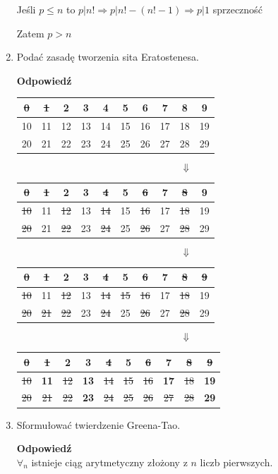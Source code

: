 \documentclass[12pt,a4paper]{article}
\newcounter{twierdzenie}
\theoremstyle{break}
\newcommand{\Odp}[1]{
		\begin{mdframed}[style=zadanie]
			\textbf{Odpowiedź}\\
			#1
		\end{mdframed}
	}
\begin{document}
\begin{enumerate}[1.]
{\begin{enumerate}[$1^\circ$]
			Jeśli $p\leq n$ to $p|n! \Rightarrow p|n!-(n!-1) \Rightarrow p|1$ sprzeczność
			
			Zatem $p>n$
		\end{enumerate}
	}
	
	\item Podać zasadę tworzenia sita Eratostenesa.
	\Odp{
		\centering\begin{tabular}{|c|c|c|c|c|c|c|c|c|c|}\hline
			\sout{0}&\sout{1}&2&3&4&5&6&7&8&9\\\hline
			10&11&12&13&14&15&16&17&18&19\\\hline
			20&21&22&23&24&25&26&27&28&29\\\hline
		\end{tabular}
		$$\Downarrow$$
		\centering\begin{tabular}{|c|c|c|c|c|c|c|c|c|c|}\hline
			\sout{0}&\sout{1}&\textbf{2}&3&\sout{4}&5&\sout{6}&7&\sout{8}&9\\\hline
			\sout{10}&11&\sout{12}&13&\sout{14}&15&\sout{16}&17&\sout{18}&19\\\hline
			\sout{20}&21&\sout{22}&23&\sout{24}&25&\sout{26}&27&\sout{28}&29\\\hline
		\end{tabular}
		$$\Downarrow$$
		\centering\begin{tabular}{|c|c|c|c|c|c|c|c|c|c|}\hline
			\sout{0}&\sout{1}&\textbf{2}&\textbf{3}&\sout{4}&5&\sout{6}&7&\sout{8}&\sout{9}\\\hline
			\sout{10}&11&\sout{12}&13&\sout{14}&\sout{15}&\sout{16}&17&\sout{18}&19\\\hline
			\sout{20}&\sout{21}&\sout{22}&23&\sout{24}&25&\sout{26}&27&\sout{28}&29\\\hline
		\end{tabular}
		$$\Downarrow$$
		\centering\begin{tabular}{|c|c|c|c|c|c|c|c|c|c|}\hline
			\sout{0}&\sout{1}&\textbf{2}&\textbf{3}&\sout{4}&\textbf{5}&\sout{6}&\textbf{7}&\sout{8}&\sout{9}\\\hline
			\sout{10}&\textbf{11}&\sout{12}&\textbf{13}&\sout{14}&\sout{15}&\sout{16}&\textbf{17}&\sout{18}&\textbf{19}\\\hline
			\sout{20}&\sout{21}&\sout{22}&\textbf{23}&\sout{24}&\sout{25}&\sout{26}&\sout{27}&\sout{28}&\textbf{29}\\\hline
		\end{tabular}
	}
	
	\item Sformułować twierdzenie Greena-Tao.
	\Odp{
		$\forall_n$ istnieje ciąg arytmetyczny złożony z $n$ liczb pierwszych.
	}
	

\end{enumerate}
\end{document}
